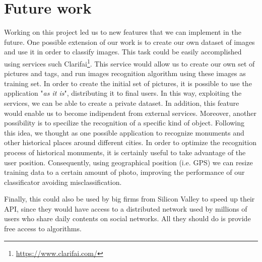 \section{Future work}
\label{sec:future}

Working on this project led us to new features that we can implement in the future.
One possible extension of our work is to create our own dataset of images and use it in order to classify images. This task could be easily accomplished using services such Clarifai\footnote{\url{https://www.clarifai.com/}}. This service would allow us to create our own set of pictures and tags, and run images recognition algorithm using these images as training set. In order to create the initial set of pictures, it is possible to use the application "\textit{as it is}", distributing it to final users. In this way, exploiting the services, we can be able to create a private dataset. In addition, this feature would enable us to become indipendent from external services.
Moreover, another possibility is to specilize the recognition of a specific kind of object. Following this idea, we thought as one possible application to recognize monuments and other historical places around different cities. In order to optimize the recognition process of historical monuments, it is certainly useful to take advantage of the user position. Consequently, using geographical position (i.e. GPS) we can resize training data to a certain amount of photo, improving the performance of our classificator avoiding misclassification.

Finally, this could also be used by big firms from Silicon Valley to speed up their API, since they would have access to a distributed network used by millions of users who share daily contents on social networks. All they should do is provide free access to algorithms.